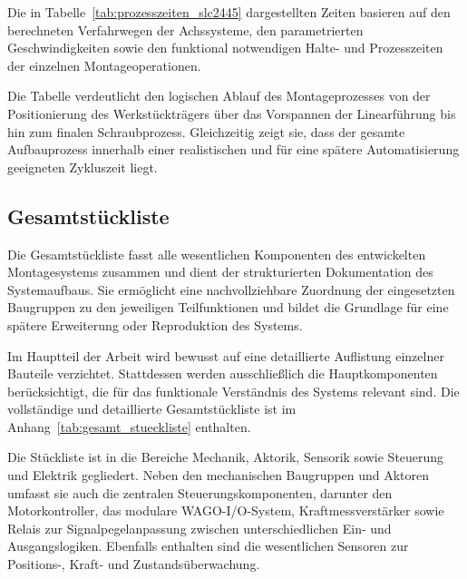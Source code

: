 Die in Tabelle~\ref{tab:prozesszeiten_slc2445} dargestellten Zeiten basieren auf den berechneten Verfahrwegen der Achssysteme, den parametrierten Geschwindigkeiten sowie den funktional notwendigen Halte- und Prozesszeiten der einzelnen Montageoperationen. 

Die Tabelle verdeutlicht den logischen Ablauf des Montageprozesses von der Positionierung des Werkstückträgers über das Vorspannen der Linearführung bis hin zum finalen Schraubprozess. Gleichzeitig zeigt sie, dass der gesamte Aufbauprozess innerhalb einer realistischen und für eine spätere Automatisierung geeigneten Zykluszeit liegt.

\subsection{Gesamtstückliste}
Die Gesamtstückliste fasst alle wesentlichen Komponenten des entwickelten Montagesystems zusammen und dient der strukturierten Dokumentation des Systemaufbaus. Sie ermöglicht eine nachvollziehbare Zuordnung der eingesetzten Baugruppen zu den jeweiligen Teilfunktionen und bildet die Grundlage für eine spätere Erweiterung oder Reproduktion des Systems.

Im Hauptteil der Arbeit wird bewusst auf eine detaillierte Auflistung einzelner Bauteile verzichtet. Stattdessen werden ausschließlich die Hauptkomponenten berücksichtigt, die für das funktionale Verständnis des Systems relevant sind. Die vollständige und detaillierte Gesamtstückliste ist im Anhang~\ref{tab:gesamt_stueckliste} enthalten.

Die Stückliste ist in die Bereiche Mechanik, Aktorik, Sensorik sowie Steuerung und Elektrik gegliedert. Neben den mechanischen Baugruppen und Aktoren umfasst sie auch die zentralen Steuerungskomponenten, darunter den Motorkontroller, das modulare WAGO-I/O-System, Kraftmessverstärker sowie Relais zur Signalpegelanpassung zwischen unterschiedlichen Ein- und Ausgangslogiken. Ebenfalls enthalten sind die wesentlichen Sensoren zur Positions-, Kraft- und Zustandsüberwachung.